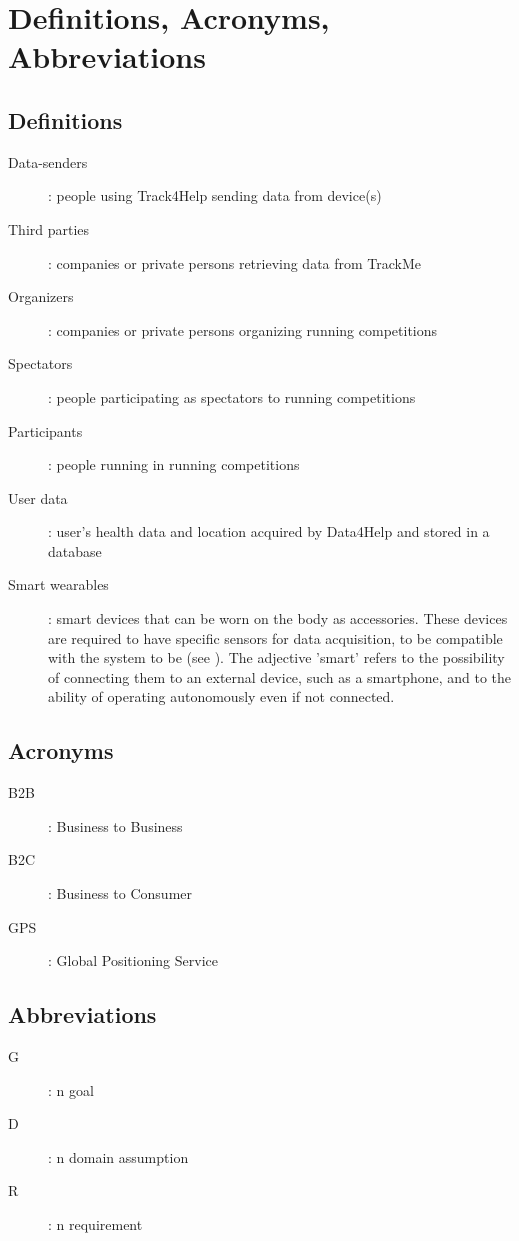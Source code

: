 \documentclass[../../rasd.tex]{subfiles}
\begin{document}
\section{Definitions, Acronyms, Abbreviations}
		\subsection{Definitions}
		\begin{description}
			\item[Data-senders]: people using Track4Help sending data from device(s)
			\item[Third parties]: companies or private persons retrieving data from TrackMe
			\item[Organizers]: companies or private persons organizing running competitions
			\item[Spectators]: people participating as spectators to running competitions
			\item[Participants]: people running in running competitions
			\item[User data]: user's health data and location acquired by Data4Help and stored in a database
			\item[Smart wearables]: smart devices that can be worn on the body as accessories. These devices are required to have specific sensors for data acquisition, to be compatible with the system to be (see ). The adjective 'smart' refers to the possibility of connecting them to an external device, such as a smartphone, and to the ability of operating autonomously even if not connected.
		\end{description}
		\subsection{Acronyms}
		\begin{description}
		\item[B2B]: Business to Business
		\item[B2C]: Business to Consumer
		\item[GPS]: Global Positioning Service
		\end{description}
		\subsection{Abbreviations}
		\begin{description}
			\item[G]: n goal
			\item[D]: n domain assumption
			\item[R]: n requirement
			
		\end{description}
		
\end{document}
